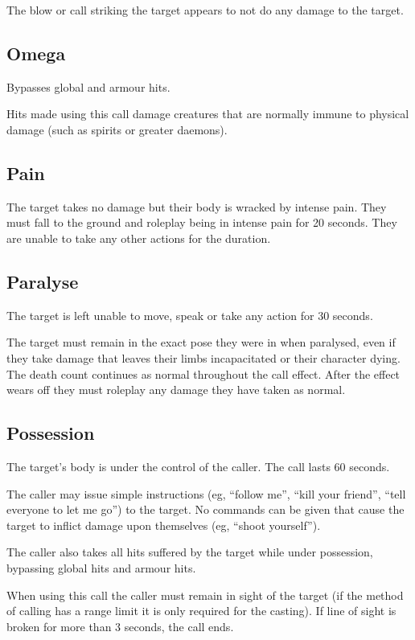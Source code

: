 The blow or call striking the target appears to not do any damage to the target.

\subsection{Omega}

Bypasses global and armour hits.

Hits made using this call damage creatures that are normally immune to physical damage (such as spirits or greater daemons).

\subsection{Pain}

The target takes no damage but their body is wracked by intense pain. They must fall to the ground and roleplay being in intense pain for 20 seconds. They are unable to take any other actions for the duration.

\subsection{Paralyse}

The target is left unable to move, speak or take any action for 30 seconds.

The target must remain in the exact pose they were in when paralysed, even if they take damage that leaves their limbs incapacitated or their character dying. The death count continues as normal throughout the call effect. After the effect wears off they must roleplay any damage they have taken as normal.

\subsection{Possession}

The target's body is under the control of the caller. The call lasts 60 seconds.

The caller may issue simple instructions (eg, ``follow me'', ``kill your friend'', ``tell everyone to let me go'') to the target. No commands can be given that cause the target to inflict damage upon themselves (eg, ``shoot yourself'').

The caller also takes all hits suffered by the target while under possession, bypassing global hits and armour hits.

When using this call the caller must remain in sight of the target (if the method of calling has a range limit it is only required for the casting). If line of sight is broken for more than 3 seconds, the call ends.

